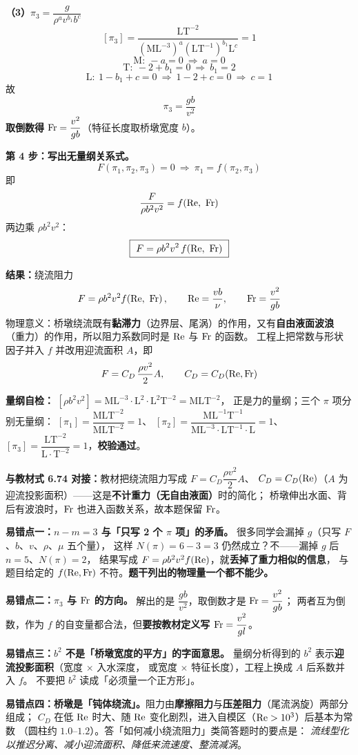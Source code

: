 \begin{jie}
\textbf{（3）$\pi_3=\dfrac{g}{\rho^{a}v^{b_1}b^{c}}$}
\[ [\pi_3]=\frac{\mathrm{LT^{-2}}}
   {\left(\mathrm{ML^{-3}}\right)^{a}\left(\mathrm{LT^{-1}}\right)^{b_1}\mathrm{L}^{c}}=1 \]
\[ \mathrm{M}:\ -a=0\ \Longrightarrow\ a=0 \]
\[ \mathrm{T}:\ -2+b_1=0\ \Longrightarrow\ b_1=2 \]
\[ \mathrm{L}:\ 1-b_1+c=0\ \Longrightarrow\ 1-2+c=0\ \Longrightarrow\ c=1 \]
故
\[ \pi_3=\frac{gb}{v^{2}} \]
\textbf{取倒数得} $\mathrm{Fr}=\dfrac{v^{2}}{gb}$（特征长度取桥墩宽度 $b$）。

\textbf{第 4 步：写出无量纲关系式。}
\[ F(\pi_1,\pi_2,\pi_3)=0\ \Longrightarrow\ \pi_1=f(\pi_2,\pi_3) \]
即
\[ \frac{F}{\rho b^{2}v^{2}}=f\!\left(\mathrm{Re},\ \mathrm{Fr}\right) \]
两边乘 $\rho b^{2}v^{2}$：
\[ \boxed{\ F=\rho b^{2}v^{2}\,f\!\left(\Rey,\ \Fr\right)\ } \]

\textbf{结果：}绕流阻力
\[ F=\rho b^{2}v^{2}f\!\left(\mathrm{Re},\ \mathrm{Fr}\right),\qquad
   \mathrm{Re}=\frac{vb}{\nu},\qquad \mathrm{Fr}=\frac{v^{2}}{gb} \]
物理意义：桥墩绕流既有\textbf{黏滞力}（边界层、尾涡）的作用，又有\textbf{自由液面波浪}
（重力）的作用，所以阻力系数同时是 $\mathrm{Re}$ 与 $\mathrm{Fr}$ 的函数。
工程上把常数与形状因子并入 $f$ 并改用迎流面积 $A$，即
\[ F=C_D\,\frac{\rho v^{2}}{2}A,\qquad C_D=C_D(\mathrm{Re},\mathrm{Fr}) \]

\textbf{量纲自检：}
$[\rho b^{2}v^{2}]=\mathrm{ML^{-3}}\cdot\mathrm{L^{2}}\cdot\mathrm{L^{2}T^{-2}}=\mathrm{MLT^{-2}}$，
正是力的量纲；三个 $\pi$ 项分别无量纲：
$[\pi_1]=\dfrac{\mathrm{MLT^{-2}}}{\mathrm{MLT^{-2}}}=1$、
$[\pi_2]=\dfrac{\mathrm{ML^{-1}T^{-1}}}{\mathrm{ML^{-3}}\cdot\mathrm{LT^{-1}}\cdot\mathrm{L}}=1$、
$[\pi_3]=\dfrac{\mathrm{LT^{-2}}}{\mathrm{L}\cdot\mathrm{T^{-2}}}=1$，\textbf{校验通过}。

\textbf{与教材式 6.74 对接：}教材把绕流阻力写成 $F=C_D\dfrac{\rho v^{2}}{2}A$、
$C_D=C_D(\mathrm{Re})$（$A$ 为迎流投影面积）——这是\textbf{不计重力（无自由液面）}时的简化；
桥墩伸出水面、背后有波浪时，$\mathrm{Fr}$ 也进入函数关系，故本题保留 $\mathrm{Fr}$。
\end{jie}

\begin{yicuo}
\textbf{易错点一：$n-m=3$ 与「只写 2 个 $\pi$ 项」的矛盾。}
很多同学会漏掉 $g$（只写 $F$、$b$、$v$、$\rho$、$\mu$ 五个量），
这样 $N(\pi)=6-3=3$ 仍然成立？不——漏掉 $g$ 后 $n=5$、$N(\pi)=2$，
结果写成 $F=\rho b^{2}v^{2}f(\mathrm{Re})$，就\textbf{丢掉了重力相似的信息}，
与题目给定的 $f(\mathrm{Re},\mathrm{Fr})$ 不符。\textbf{题干列出的物理量一个都不能少。}

\textbf{易错点二：$\pi_3$ 与 $\mathrm{Fr}$ 的方向。}
解出的是 $\dfrac{gb}{v^{2}}$，取倒数才是 $\mathrm{Fr}=\dfrac{v^{2}}{gb}$；
两者互为倒数，作为 $f$ 的自变量都合法，但\textbf{要按教材定义写 $\mathrm{Fr}=\dfrac{v^{2}}{gl}$}。

\textbf{易错点三：$b^{2}$ 不是「桥墩宽度的平方」的字面意思。}
量纲分析得到的 $b^{2}$ 表示\textbf{迎流投影面积}（宽度 $\times$ 入水深度，
或宽度 $\times$ 特征长度），工程上换成 $A$ 后系数并入 $f$。
不要把 $b^{2}$ 读成「必须量一个正方形」。

\textbf{易错点四：桥墩是「钝体绕流」。}阻力由\textbf{摩擦阻力}与\textbf{压差阻力}（尾流涡旋）两部分组成；
$C_D$ 在低 $\mathrm{Re}$ 时大、随 $\mathrm{Re}$ 变化剧烈，进入自模区（$\mathrm{Re}>10^{3}$）后基本为常数
（圆柱约 $1.0$--$1.2$）。答「如何减小绕流阻力」类简答题时的要点是：
\emph{流线型化以推迟分离、减小迎流面积、降低来流速度、整流减涡}。
\end{yicuo}

